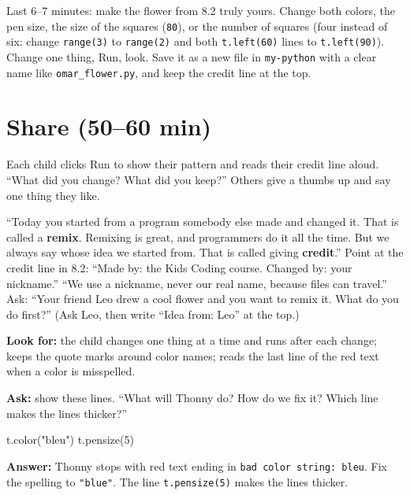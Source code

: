 \begin{freebuild}
Last 6--7 minutes: make the flower from 8.2 truly yours. Change both colors, the pen size, the size of the squares (\texttt{80}), or the number of squares (four instead of six: change \texttt{range(3)} to \texttt{range(2)} and both \texttt{t.left(60)} lines to \texttt{t.left(90)}). Change one thing, Run, look. Save it as a new file in \texttt{my-python} with a clear name like \texttt{omar\_flower.py}, and keep the credit line at the top.
\end{freebuild}

\section{Share (50--60 min)}
\begin{teacherscript}
Each child clicks Run to show their pattern and reads their credit line aloud. \enquote{What did you change? What did you keep?} Others give a thumbs up and say one thing they like.
\end{teacherscript}

\begin{safety}
\enquote{Today you started from a program somebody else made and changed it. That is called a \textbf{remix}. Remixing is great, and programmers do it all the time. But we always say whose idea we started from. That is called giving \textbf{credit}.} Point at the credit line in 8.2: \enquote{Made by: the Kids Coding course. Changed by: your nickname.} \enquote{We use a nickname, never our real name, because files can travel.} Ask: \enquote{Your friend Leo drew a cool flower and you want to remix it. What do you do first?} (Ask Leo, then write \enquote{Idea from: Leo} at the top.)
\end{safety}

\begin{formativecheck}
\textbf{Look for:} the child changes one thing at a time and runs after each change; keeps the quote marks around color names; reads the last line of the red text when a color is misspelled.

\textbf{Ask:} show these lines. \enquote{What will Thonny do? How do we fix it? Which line makes the lines thicker?}
\begin{pycode}
t.color("bleu")
t.pensize(5)
\end{pycode}
\textbf{Answer:} Thonny stops with red text ending in \texttt{bad color string: bleu}. Fix the spelling to \texttt{"blue"}. The line \texttt{t.pensize(5)} makes the lines thicker.
\end{formativecheck}


